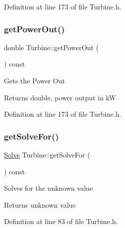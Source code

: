 Definition at line 173 of file Turbine.\+h.

\mbox{\label{class_turbine_a89585cc2fbfdbe67d539eae08c369fa2}} 
\subsubsection{\texorpdfstring{get\+Power\+Out()}{getPowerOut()}\hspace{0.1cm}{\footnotesize\ttfamily [3/3]}}
{\footnotesize\ttfamily double Turbine\+::get\+Power\+Out (\begin{DoxyParamCaption}{ }\end{DoxyParamCaption}) const\hspace{0.3cm}{\ttfamily [inline]}}

Gets the Power Out

\begin{DoxyReturn}{Returns}
double, power output in kW 
\end{DoxyReturn}


Definition at line 173 of file Turbine.\+h.

\mbox{\label{class_turbine_a58c73057a4b890eab2af2b42c82484e6}} 
\subsubsection{\texorpdfstring{get\+Solve\+For()}{getSolveFor()}\hspace{0.1cm}{\footnotesize\ttfamily [1/3]}}
{\footnotesize\ttfamily \hyperlink{class_turbine_a9fd7beba6c6f071e228fbe3e07969d2b}{Solve} Turbine\+::get\+Solve\+For (\begin{DoxyParamCaption}{ }\end{DoxyParamCaption}) const\hspace{0.3cm}{\ttfamily [inline]}}

Solves for the unknown value

\begin{DoxyReturn}{Returns}
unknown value 
\end{DoxyReturn}


Definition at line 83 of file Turbine.\+h.

\mbox{\label{class_turbine_a58c73057a4b890eab2af2b42c82484e6}} 
